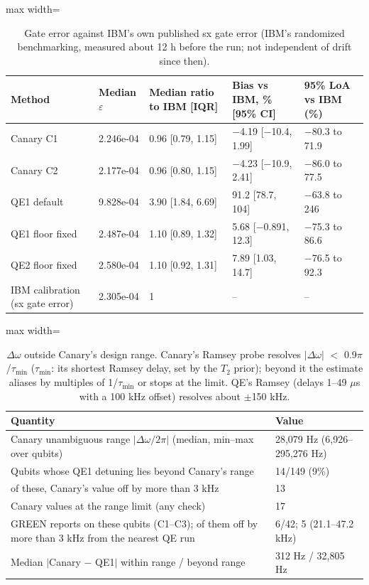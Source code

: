 \begin{table}[!t]
\centering
\footnotesize
\caption{Gate error against IBM's own published sx gate error (IBM's randomized benchmarking, measured about 12 h before the run; not independent of drift since then).}
\label{tab:h4}
\begin{adjustbox}{max width=\linewidth}
\begin{tabular}{lllll}
\hline
Method & Median $\varepsilon$ & Median ratio to IBM [IQR] & Bias vs IBM, \% [95\% CI] & 95\% LoA vs IBM (\%) \\
\hline
Canary C1 & 2.246e-04 & 0.96 [0.79, 1.15] & $-$4.19 [$-$10.4, 1.99] & $-$80.3 to 71.9 \\
Canary C2 & 2.177e-04 & 0.96 [0.80, 1.15] & $-$4.23 [$-$10.9, 2.41] & $-$86.0 to 77.5 \\
QE1 default & 9.828e-04 & 3.90 [1.84, 6.69] & 91.2 [78.7, 104] & $-$63.8 to 246 \\
QE1 floor fixed & 2.487e-04 & 1.10 [0.89, 1.32] & 5.68 [$-$0.891, 12.3] & $-$75.3 to 86.6 \\
QE2 floor fixed & 2.580e-04 & 1.10 [0.92, 1.31] & 7.89 [1.03, 14.7] & $-$76.5 to 92.3 \\
IBM calibration (sx gate error) & 2.305e-04 & 1 & -- & -- \\
\hline
\end{tabular}
\end{adjustbox}
\end{table}

\begin{table}[!t]
\centering
\footnotesize
\caption{$\Delta\omega$ outside Canary's design range. Canary's Ramsey probe resolves $|$$\Delta\omega$$|$ $<$ 0.9$\pi$/$\tau_{\min}$ ($\tau_{\min}$: its shortest Ramsey delay, set by the $T_2$ prior); beyond it the estimate aliases by multiples of 1/$\tau_{\min}$ or stops at the limit. QE's Ramsey (delays 1--49 $\mu$s with a 100 kHz offset) resolves about $\pm$150 kHz.}
\label{tab:h5}
\begin{adjustbox}{max width=\linewidth}
\begin{tabular}{ll}
\hline
Quantity & Value \\
\hline
Canary unambiguous range $|$$\Delta\omega/2\pi$$|$ (median, min--max over qubits) & 28,079 Hz (6,926--295,276 Hz) \\
Qubits whose QE1 detuning lies beyond Canary's range & 14/149 (9\%) \\
of these, Canary's value off by more than 3 kHz & 13 \\
Canary values at the range limit (any check) & 17 \\
GREEN reports on these qubits (C1--C3); of them off by more than 3 kHz from the nearest QE run & 6/42; 5 (21.1--47.2 kHz) \\
Median $|$Canary $-$ QE1$|$ within range / beyond range & 312 Hz / 32,805 Hz \\
\hline
\end{tabular}
\end{adjustbox}
\end{table}

